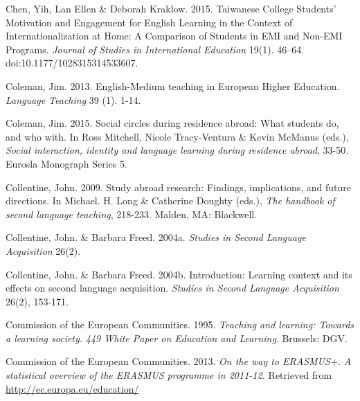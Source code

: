 \begin{styleStandard}
Chen, Yih, Lan Ellen \& Deborah Kraklow. 2015. Taiwanese College Students’ Motivation and Engagement for English Learning in the Context of Internationalization at Home: A Comparison of Students in EMI and Non-EMI Programs. \textit{Journal of Studies in International Education} 19(1). 46–64. doi:10.1177/1028315314533607.
\end{styleStandard}


\begin{styleStandard}
Coleman, Jim. 2013. English-Medium teaching in European Higher Education. \textit{Language Teaching }39 (1). 1-14.
\end{styleStandard}


\begin{styleStandard}
Coleman, Jim. 2015. Social circles during residence abroad: What students do, and who with. In Ross Mitchell, Nicole Tracy-Ventura \& Kevin McManus (eds.), \textit{Social interaction, identity and language learning during residence abroad}, 33-50\textit{. }Eurosla Monograph Series 5.
\end{styleStandard}


\begin{styleStandard}
Collentine, John. 2009. Study abroad research: Findings, implications, and future directions. In Michael. H. Long \& Catherine Doughty (eds.), \textit{The handbook of second language teaching}, 218-233. Malden, MA: Blackwell.
\end{styleStandard}


\begin{styleStandard}
Collentine, John. \& Barbara Freed. 2004a. \textit{Studies in Second Language Acquisition }26(2).
\end{styleStandard}


\begin{styleStandard}
Collentine, John. \& Barbara Freed. 2004b. Introduction: Learning context and its effects on second language acquisition. \textit{Studies in Second Language Acquisition }26(2), 153-171.
\end{styleStandard}


\begin{styleStandard}
Commission of the European Communities. 1995. \textit{Teaching and learning: Towards a learning society. }\textit{449 White Paper on Education and Learning}. Brussels: DGV.
\end{styleStandard}


\begin{styleStandard}
Commission of the European Communities. 2013. \textit{On the way to ERASMUS+. A statistical overview of the ERASMUS programme in 2011-12. }Retrieved from \url{http://ec.europa.eu/education/}
\end{styleStandard}


